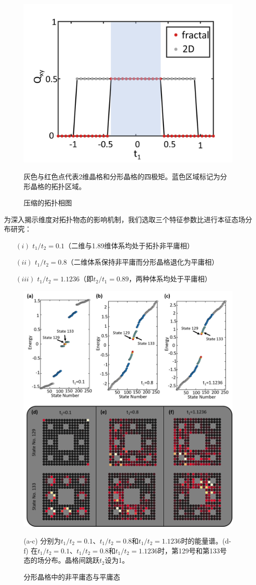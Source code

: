 \begin{figure}[htbp]
    \centering
    \includegraphics[width=0.5\linewidth]{figure/HOTITheo/Quadrupole.png}
    \caption{压缩的拓扑相图}灰色与红色点代表2维晶格和分形晶格的四极矩。蓝色区域标记为分形晶格的拓扑区域。
    \label{fig:Quadrupole}
\end{figure}

为深入揭示维度对拓扑物态的影响机制，我们选取三个特征参数比进行本征态场分布研究：
\begin{itemize}
    \item [$(i)$] $t_1/t_2=0.1$（二维与1.89维体系均处于拓扑非平庸相）
    \item [$(ii)$] $t_1/t_2=0.8$（二维体系保持非平庸而分形晶格退化为平庸相）
    \item [$(iii)$] $t_1/t_2=1.1236$（即$t_2/t_1=0.89$，两种体系均处于平庸相）
\end{itemize}

\begin{figure}[htbp]
    \centering
    \includegraphics[width=0.75\linewidth]{figure/HOTITheo/Transition.png}
    \caption{分形晶格中的非平庸态与平庸态}(a-c) 分别为$t_1/t_2=0.1$、$t_1/t_2=0.8$和$t_1/t_2=1.1236$时的能量谱。(d-f) 在$t_1/t_2=0.1$、$t_1/t_2=0.8$和$t_1/t_2=1.1236$时，第129号和第133号态的场分布。晶格间跳跃$t_2$设为1。
    \label{fig:Transition}
\end{figure}

